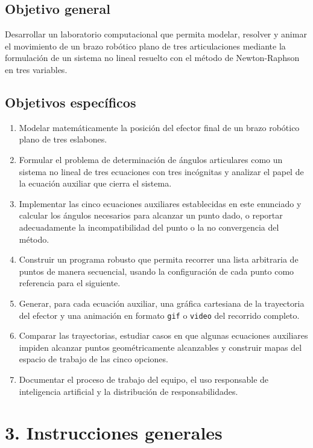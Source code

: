 \documentclass[12pt]{article}
\begin{document}
\subsection*{Objetivo general}

Desarrollar un laboratorio computacional que permita modelar, resolver y animar el movimiento de un brazo robótico plano de tres articulaciones mediante la formulación de un sistema no lineal resuelto con el método de Newton-Raphson en tres variables.

\subsection*{Objetivos específicos}

\begin{enumerate}[label=\arabic*.]
    \item Modelar matemáticamente la posición del efector final de un brazo robótico plano de tres eslabones.
    \item Formular el problema de determinación de ángulos articulares como un sistema no lineal de tres ecuaciones con tres incógnitas y analizar el papel de la ecuación auxiliar que cierra el sistema.
    \item Implementar las cinco ecuaciones auxiliares establecidas en este enunciado y calcular los ángulos necesarios para alcanzar un punto dado, o reportar adecuadamente la incompatibilidad del punto o la no convergencia del método.
    \item Construir un programa robusto que permita recorrer una lista arbitraria de puntos de manera secuencial, usando la configuración de cada punto como referencia para el siguiente.
    \item Generar, para cada ecuación auxiliar, una gráfica cartesiana de la trayectoria del efector y una animación en formato \texttt{gif} o \texttt{video} del recorrido completo.
    \item Comparar las trayectorias, estudiar casos en que algunas ecuaciones auxiliares impiden alcanzar puntos geométricamente alcanzables y construir mapas del espacio de trabajo de las cinco opciones.
    \item Documentar el proceso de trabajo del equipo, el uso responsable de inteligencia artificial y la distribución de responsabilidades.
\end{enumerate}

\section*{3. Instrucciones generales}
\end{document}
